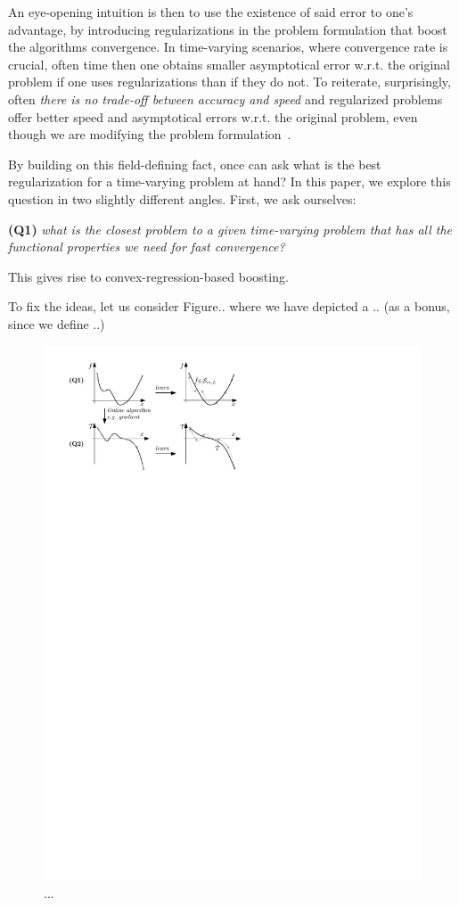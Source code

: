 \documentclass{article}
\begin{document}
An eye-opening intuition is then to use the existence of said error to one's advantage, by introducing regularizations in the problem formulation that boost the algorithms convergence. In time-varying scenarios, where convergence rate is crucial, often time then one obtains smaller asymptotical error w.r.t. the original problem if one uses regularizations than if they do not. To reiterate, surprisingly, often \emph{there is no trade-off between accuracy and speed} and regularized problems offer better speed and asymptotical errors w.r.t. the original problem, even though we are modifying the problem formulation~\cite{.,.}.  

By building on this field-defining fact, once can ask what is the best regularization for a time-varying problem at hand? In this paper, we explore this question in two slightly different angles. First, we ask ourselves: 

{\bf (Q1) } \emph{what is the closest problem to a given time-varying problem that has all the functional properties we need for fast convergence?}

This gives rise to convex-regression-based boosting. 
 
To fix the ideas, let us consider Figure.. where we have depicted a .. (as a bonus, since we define ..) 

\begin{figure}
\centering
\includegraphics[width=.925\columnwidth]{Figures/explanation}
\caption{...}
\label{fig.1}
\end{figure}
\end{document}
